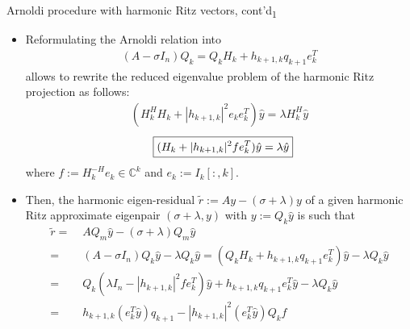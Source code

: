 \documentclass[t,usepdftitle=false]{beamer}
\begin{document}
\begin{frame}{Arnoldi procedure with harmonic Ritz vectors, cont'd\textsubscript{1}}
\begin{itemize}
\item Reformulating the Arnoldi relation into 
\begin{align*}
(A-\sigma I_n)Q_k=Q_{k}H_k+h_{k+1,k}q_{k+1}e_k^T
\end{align*}
allows to rewrite the reduced eigenvalue problem of the harmonic Ritz projection as follows:
\begin{align*}
(H_k^HH_k+|h_{k+1,k}|^2e_ke_k^T)\hat{y}=\lambda H_k^H\hat{y}
\end{align*}
\vspace{-.65cm}
\begin{align*}
\hspace{.23cm}\boxed{(H_k+|h_{k+1,k}|^2fe_k^T)\hat{y}=\lambda\hat{y}}
\end{align*}
where $f:=H_k^{-H}e_k\in\mathbb{C}^{k}$ and $e_k:=I_k[:,k]$.
\item Then, the harmonic eigen-residual $\tilde{r}:=Ay-(\sigma+\lambda )y$ of a given harmonic Ritz approximate eigenpair $(\sigma+\lambda,y)$ with $y:=Q_k\hat{y}$ is such that
\vspace{-.1cm}
\begin{align*}
\tilde{r}=&\;AQ_m\hat{y}-(\sigma+\lambda)Q_m\hat{y}\\
=&\;(A-\sigma I_n)Q_k\hat{y}-\lambda Q_k\hat{y}=(Q_{k}H_k+h_{k+1,k}q_{k+1}e_k^T)\hat{y}-\lambda Q_k\hat{y}\\
=&\;Q_k(\lambda I_n-|h_{k+1,k}|^2fe_k^T)\hat{y}+h_{k+1,k}q_{k+1}e_k^T\hat{y}-\lambda Q_k\hat{y}\\
=&\;h_{k+1,k}(e_k^T\hat{y})q_{k+1}-|h_{k+1,k}|^2(e_k^T\hat{y})Q_kf
\end{align*}
\end{itemize}
\end{frame}
\end{document}
